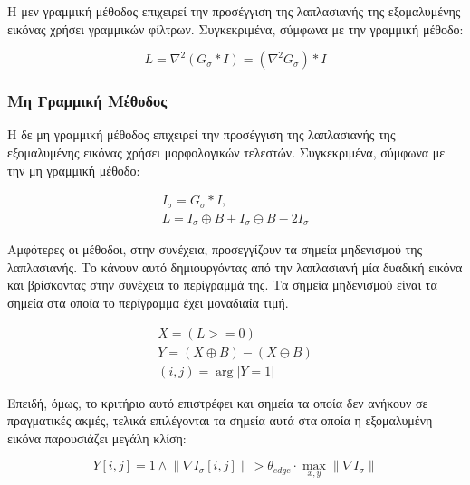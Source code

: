 \documentclass{article}
\begin{document}
Η μεν γραμμική μέθοδος επιχειρεί την προσέγγιση της λαπλασιανής της εξομαλυμένης εικόνας χρήσει γραμμικών φίλτρων. Συγκεκριμένα, σύμφωνα με την γραμμική μέθοδο:

\begin{equation}
    L = \nabla^2 \left(G_{\sigma} * I\right) = \left( \nabla^2 G_{\sigma} \right) * I
\end{equation}

\subsubsection{Μη Γραμμική Μέθοδος}

Η δε μη γραμμική μέθοδος επιχειρεί την προσέγγιση της λαπλασιανής της εξομαλυμένης εικόνας χρήσει μορφολογικών τελεστών. Συγκεκριμένα, σύμφωνα με την μη γραμμική μέθοδο:

\begin{equation}
    \begin{gathered}
        I_{\sigma} = G_{\sigma} * I, \\
        L = I_{\sigma} \oplus B + I_{\sigma} \ominus B - 2I_{\sigma}
    \end{gathered}
\end{equation}

Αμφότερες οι μέθοδοι, στην συνέχεια, προσεγγίζουν τα σημεία μηδενισμού της λαπλασιανής. Το κάνουν αυτό δημιουργόντας από την λαπλασιανή μία δυαδική εικόνα και βρίσκοντας στην συνέχεια το περίγραμμά της. Τα σημεία μηδενισμού είναι τα σημεία στα οποία το περίγραμμα έχει μοναδιαία τιμή.

\begin{equation}
    \begin{gathered}
        X = (L >= 0)\\
        Y = (X \oplus B) - (X \ominus B)\\
        (i, j) = \arg \left| Y = 1  \right|
    \end{gathered}
\end{equation}

Επειδή, όμως, το κριτήριο αυτό επιστρέφει και σημεία τα οποία δεν ανήκουν σε πραγματικές ακμές, τελικά επιλέγονται τα σημεία αυτά στα οποία η εξομαλυμένη εικόνα παρουσιάζει μεγάλη κλίση:

\begin{equation}
    Y[i, j] = 1 \wedge \lVert \nabla I_{\sigma}[i,j] \rVert > \theta_{edge} \cdot  \underset{x, y} \max \lVert \nabla I_{\sigma} \rVert
\end{equation}
\end{document}
